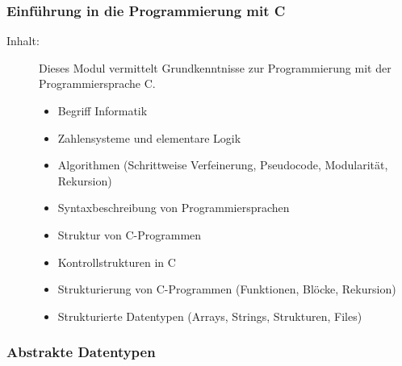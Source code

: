 \documentclass[%
a4paper, %
11pt,               %
leqno,              %
fleqn,              %
]
{scrartcl}
\begin{document}

\subsubsection{Einführung in die Programmierung mit C} %
\label{ssub:Einführung in die Programmierung mit C}

\begin{description}
  \item[Inhalt:] Dieses Modul vermittelt Grundkenntnisse zur Programmierung mit
    der Programmiersprache C.
  \begin{itemize}\itemsep0pt
    \item Begriff Informatik
    \item Zahlensysteme und elementare Logik
    \item Algorithmen (Schrittweise Verfeinerung, Pseudocode, Modularität,
      Rekursion)
    \item Syntaxbeschreibung von Programmiersprachen
    \item Struktur von C-Programmen
    \item Kontrollstrukturen in C
    \item Strukturierung von C-Programmen (Funktionen, Blöcke, Rekursion)
    \item Strukturierte Datentypen (Arrays, Strings, Strukturen, Files)
  \end{itemize}
\end{description}


\subsubsection{Abstrakte Datentypen} %
\label{ssub:Abstrakte Datentypen}
\end{document}
